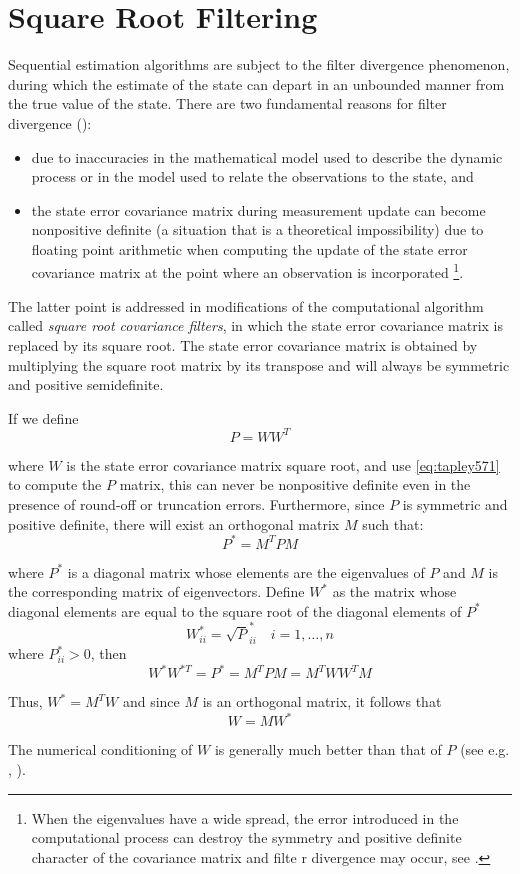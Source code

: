 \section{Square Root Filtering}
\label{sec:square-root-filtering}
Sequential estimation algorithms are subject to the filter divergence phenomenon, during
which the estimate of the state can depart in an unbounded manner from the true value
of the state. There are two fundamental reasons for filter divergence (\cite{tapley}):
\begin{itemize}
	\item due to inaccuracies in the mathematical model used to describe the dynamic
	      process or in the model used to relate the observations to the state, and
	\item the state error covariance matrix during measurement update can become nonpositive
	      definite (a situation that is a theoretical impossibility) due to floating point
	      arithmetic when computing the update of the state error covariance matrix at the
	      point where an observation is incorporated \footnote{When the eigenvalues have a wide spread, the error
		      introduced in the computational process can destroy the symmetry and positive
		      definite character of the covariance matrix and filte r divergence may occur, see \cite{tapley}.}.
\end{itemize}

The latter point is addressed in modifications of the computational algorithm called
\emph{square root covariance filters}, in which the state error covariance matrix is
replaced by its square root. The state error covariance matrix is obtained by
multiplying the square root matrix by its transpose and will always be symmetric
and positive semidefinite.

If we define
\begin{equation}
	\label{eq:tapley571}
	P = W W^T
\end{equation}

where \(W\) is the state error covariance matrix square root, and use \ref{eq:tapley571} to
compute the \(P\) matrix, this can never be nonpositive definite even in the presence
of round-off or truncation errors. Furthermore, since \(P\) is symmetric and positive
definite, there will exist an orthogonal matrix \(M\) such that:
\begin{equation}
	\label{eq:tapley572}
	P^* = M^T P M
\end{equation}

where \(P^*\) is a diagonal matrix whose elements are the eigenvalues of \(P\) and
\(M\) is the corresponding matrix of eigenvectors. Define \(W^*\) as the matrix
whose diagonal elements are equal to the square root of the diagonal elements of \(P^*\)
\begin{equation}
	W^*_{ii} = \sqrt P^*_{ii} \quad i=1,\ldots ,n
\end{equation}
where \(P^*_{ii} > 0\), then
\begin{equation}
	W^* W^{*T} = P^* = M^T P M = M^T W W^T M
\end{equation}

Thus, \(W^* = M^T W \) and since \(M\) is an orthogonal matrix, it follows that
\begin{equation}
	\label{eq:tapley574}
	W = M W^*
\end{equation}

The numerical conditioning of \(W\) is generally much better than that of \(P\) (see
e.g. \cite{lawson1995}, \cite{tapley}).
